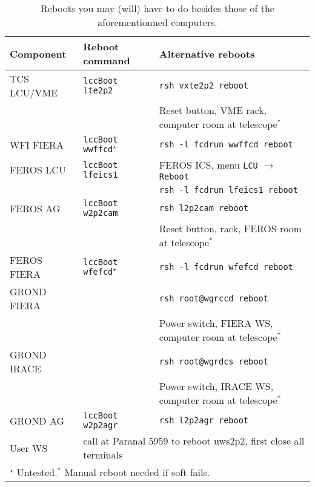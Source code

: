 \documentclass[11pt,fleqn]{book} %
\begin{document}
\begin{table}
\caption[Some useful reboots]{Reboots you may (will) have to do besides those of the aforementionned computers.}
\label{tab:reboots}
\centering
\begin{tabular}{lll}
\hline
Component   & Reboot command                       & Alternative reboots\\
\hline\hline
TCS LCU/VME & \texttt{lccBoot lte2p2}              & \texttt{rsh vxte2p2 reboot}\\ 
            &                                      & Reset button, VME rack, computer room at telescope$^\ast$\\
\hline
WFI FIERA   & \texttt{lccBoot wwffcd}$^\star$      & \texttt{rsh -l fcdrun wwffcd reboot}\\
\hline
FEROS LCU   & \texttt{lccBoot lfeics1}             & FEROS ICS, menu \texttt{LCU} $\rightarrow$ \texttt{Reboot}\\
            &                                      & \texttt{rsh -l fcdrun lfeics1 reboot}\\
FEROS AG    & \texttt{lccBoot w2p2cam}             & \texttt{rsh l2p2cam reboot}\\
            &                                      & Reset button, rack, FEROS room at telescope$^\ast$\\
FEROS FIERA & \texttt{lccBoot wfefcd}$^\star$      & \texttt{rsh -l fcdrun wfefcd reboot}\\
\hline
GROND FIERA &                                      & \texttt{rsh root@wgrccd reboot}\\
            &                                      & Power switch, FIERA WS, computer room at telescope$^\ast$\\
GROND IRACE &                                      & \texttt{rsh root@wgrdcs reboot}\\
            &                                      & Power switch, IRACE WS, computer room at telescope$^\ast$\\
GROND AG    & \texttt{lccBoot w2p2agr}             & \texttt{rsh l2p2agr reboot}\\
\hline
User WS     & \multicolumn{2}{l}{call at Paranal 5959 to reboot uws2p2, first close all terminals}\\
\hline
\multicolumn{3}{l}{$^\star$ Untested.\quad $^\ast$ Manual reboot needed if soft fails.}\\
\hline
\end{tabular}
\end{table}
\end{document}
